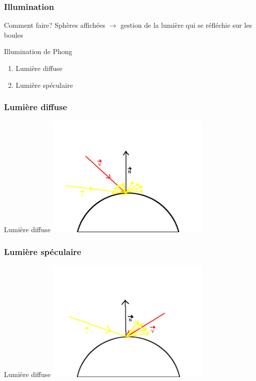 \begin{frame}
	\frametitle{Illumination}
	\begin{block}{Comment faire?}
		Sphères affichées $\rightarrow$ gestion de la lumière qui se réfléchie sur les boules
	\end{block}
	\begin{block}{Illumination de Phong}
		\begin{enumerate}
			\item Lumière diffuse
			\item Lumière spéculaire
		\end{enumerate}
	\end{block}
\end{frame}
	
\begin{frame}
	\frametitle{Lumière diffuse}
	\begin{block}{Lumière diffuse}
		\includegraphics[width = 300px]{phong1.png} 
	\end{block}
\end{frame}
	
\begin{frame}
	\frametitle{Lumière spéculaire}
	\begin{block}{Lumière diffuse}
		\includegraphics[width = 300px]{phong2.png} 
	\end{block}
\end{frame}

